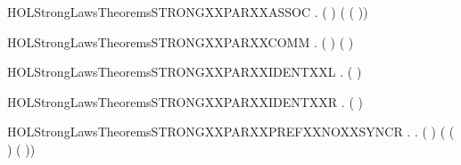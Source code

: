 \begin{SaveVerbatim}{HOLStrongLawsTheoremsSTRONGXXPARXXASSOC}
\HOLTokenTurnstile{} \HOLSymConst{\HOLTokenForall{}}  .  ( \HOLSymConst{\ensuremath{\parallel}}  \HOLSymConst{\ensuremath{\parallel}} ) ( \HOLSymConst{\ensuremath{\parallel}} ( \HOLSymConst{\ensuremath{\parallel}} ))
\end{SaveVerbatim}
\newcommand{\HOLStrongLawsTheoremsSTRONGXXPARXXASSOC}{\UseVerbatim{HOLStrongLawsTheoremsSTRONGXXPARXXASSOC}}
\begin{SaveVerbatim}{HOLStrongLawsTheoremsSTRONGXXPARXXCOMM}
\HOLTokenTurnstile{} \HOLSymConst{\HOLTokenForall{}} .  ( \HOLSymConst{\ensuremath{\parallel}} ) ( \HOLSymConst{\ensuremath{\parallel}} )
\end{SaveVerbatim}
\newcommand{\HOLStrongLawsTheoremsSTRONGXXPARXXCOMM}{\UseVerbatim{HOLStrongLawsTheoremsSTRONGXXPARXXCOMM}}
\begin{SaveVerbatim}{HOLStrongLawsTheoremsSTRONGXXPARXXIDENTXXL}
\HOLTokenTurnstile{} \HOLSymConst{\HOLTokenForall{}}.  ( \HOLSymConst{\ensuremath{\parallel}} ) 
\end{SaveVerbatim}
\newcommand{\HOLStrongLawsTheoremsSTRONGXXPARXXIDENTXXL}{\UseVerbatim{HOLStrongLawsTheoremsSTRONGXXPARXXIDENTXXL}}
\begin{SaveVerbatim}{HOLStrongLawsTheoremsSTRONGXXPARXXIDENTXXR}
\HOLTokenTurnstile{} \HOLSymConst{\HOLTokenForall{}}.  ( \HOLSymConst{\ensuremath{\parallel}} ) 
\end{SaveVerbatim}
\newcommand{\HOLStrongLawsTheoremsSTRONGXXPARXXIDENTXXR}{\UseVerbatim{HOLStrongLawsTheoremsSTRONGXXPARXXIDENTXXR}}
\begin{SaveVerbatim}{HOLStrongLawsTheoremsSTRONGXXPARXXPREFXXNOXXSYNCR}
\HOLTokenTurnstile{} \HOLSymConst{\HOLTokenForall{}} .
        \HOLSymConst{\HOLTokenNotEqual{}}   \HOLSymConst{\HOLTokenImp{}}
       \HOLSymConst{\HOLTokenForall{}} .
            (  \HOLSymConst{\ensuremath{\parallel}}  )
             ( ( \HOLSymConst{\ensuremath{\parallel}}  ) \HOLSymConst{\ensuremath{+}}
               (  \HOLSymConst{\ensuremath{\parallel}} ))
\end{SaveVerbatim}
